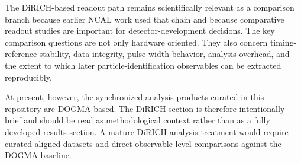 The DiRICH-based readout path remains scientifically relevant as a comparison branch because earlier NCAL work used that chain and because comparative readout studies are important for detector-development decisions. The key comparison questions are not only hardware oriented. They also concern timing-reference stability, data integrity, pulse-width behavior, analysis overhead, and the extent to which later particle-identification observables can be extracted reproducibly.

At present, however, the synchronized analysis products curated in this repository are DOGMA based. The DiRICH section is therefore intentionally brief and should be read as methodological context rather than as a fully developed results section. A mature DiRICH analysis treatment would require curated aligned datasets and direct observable-level comparisons against the DOGMA baseline.